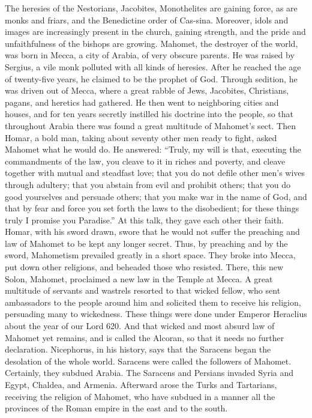 The heresies of the Nestorians, Jacobites, Monothelites are gaining force, as are monks and friars, and the Benedictine order of Cas-sina. Moreover, idols and images are increasingly present in the church, gaining strength, and the pride and unfaithfulness of the bishops are growing. Mahomet, the destroyer of the world, was born in Mecca, a city of Arabia, of very obscure parents. He was raised by Sergius, a vile monk polluted with all kinds of heresies. After he reached the age of twenty-five years, he claimed to be the prophet of God. Through sedition, he was driven out of Mecca, where a great rabble of Jews, Jacobites, Christians, pagans, and heretics had gathered. He then went to neighboring cities and houses, and for ten years secretly instilled his doctrine into the people, so that throughout Arabia there was found a great multitude of Mahomet’s sect. Then Homar, a bold man, taking about seventy other men ready to fight, asked Mahomet what he would do. He answered: “Truly, my will is that, executing the commandments of the law, you cleave to it in riches and poverty, and cleave together with mutual and steadfast love; that you do not defile other men’s wives through adultery; that you abstain from evil and prohibit others; that you do good yourselves and persuade others; that you make war in the name of God, and that by fear and force you set forth the laws to the disobedient; for these things truly I promise you Paradise.” At this talk, they gave each other their faith. Homar, with his sword drawn, swore that he would not suffer the preaching and law of Mahomet to be kept any longer secret. Thus, by preaching and by the sword, Mahometism prevailed greatly in a short space. They broke into Mecca, put down other religions, and beheaded those who resisted. There, this new Solon, Mahomet, proclaimed a new law in the Temple at Mecca. A great multitude of servants and wastrels resorted to that wicked fellow, who sent ambassadors to the people around him and solicited them to receive his religion, persuading many to wickedness. These things were done under Emperor Heraclius about the year of our Lord 620. And that wicked and most absurd law of Mahomet yet remains, and is called the Alcoran, so that it needs no further declaration. Nicephorus, in his history, says that the Saracens began the desolation of the whole world. Saracens were called the followers of Mahomet. Certainly, they subdued Arabia. The Saracens and Persians invaded Syria and Egypt, Chaldea, and Armenia. Afterward arose the Turks and Tartarians, receiving the religion of Mahomet, who have subdued in a manner all the provinces of the Roman empire in the east and to the south.

